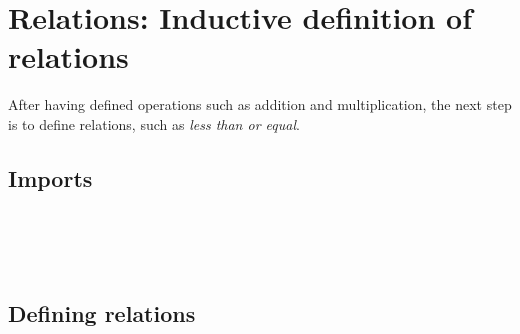 \hypertarget{Relations}{%
\chapter{Relations: Inductive definition of relations}\label{Relations}}

\begin{fence}
\begin{code}%
\>[0]\AgdaSpace{}%
\AgdaSpace{}%
\<%
\end{code}
\end{fence}

After having defined operations such as addition and multiplication, the
next step is to define relations, such as \emph{less than or equal}.

\hypertarget{imports}{%
\section{Imports}\label{imports}}

\begin{fence}
\begin{code}%
\>[0]\AgdaSpace{}%
\AgdaSpace{}%
\AgdaSpace{}%
\<%
\\
\>[0]\AgdaSpace{}%
\AgdaSpace{}%
\AgdaSpace{}%
\AgdaSymbol{(}\AgdaSymbol{;}\AgdaSpace{}%
\AgdaSymbol{;}\AgdaSpace{}%
\AgdaSymbol{)}\<%
\\
\>[0]\AgdaSpace{}%
\AgdaSpace{}%
\AgdaSpace{}%
\AgdaSpace{}%
\AgdaSymbol{(}\AgdaSymbol{;}\AgdaSpace{}%
\AgdaSymbol{;}\AgdaSpace{}%
\AgdaSymbol{;}\AgdaSpace{}%
\AgdaOperator{\AgdaPrimitive{\AgdaUnderscore{}+\AgdaUnderscore{}}}\AgdaSymbol{)}\<%
\\
\>[0]\AgdaSpace{}%
\AgdaSpace{}%
\AgdaSpace{}%
\AgdaSpace{}%
\AgdaSymbol{(}\AgdaSymbol{;}\AgdaSpace{}%
\AgdaSymbol{)}\<%
\end{code}
\end{fence}

\hypertarget{defining-relations}{%
\section{Defining relations}\label{defining-relations}}

